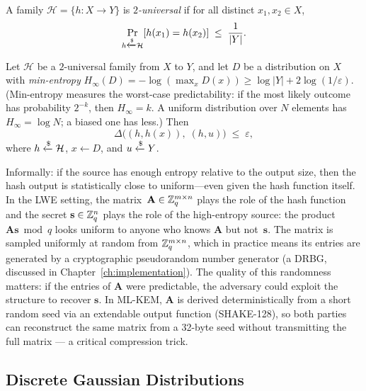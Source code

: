 \begin{definition}
\label{def:universal-hash}
A family $\mathcal{H} = \{h : X \to Y\}$ is \emph{$2$-universal} if for all distinct $x_1, x_2 \in X$,
\[
\Pr_{h \getsr \mathcal{H}}[h(x_1) = h(x_2)] \;\leq\; \frac{1}{|Y|}.
\]
\end{definition}

\begin{theorem}
\label{thm:lhl}
Let $\mathcal{H}$ be a $2$-universal family from $X$ to $Y$, and let $D$ be a distribution on $X$ with \emph{min-entropy} $H_\infty(D) = -\log(\max_x D(x)) \geq \log|Y| + 2\log(1/\varepsilon)$.  (Min-entropy measures the worst-case predictability: if the most likely outcome has probability $2^{-k}$, then $H_\infty = k$.  A uniform distribution over $N$ elements has $H_\infty = \log N$; a biased one has less.)  Then
\begin{equation}
\label{eq:lhl}
\Delta\bigl((h, h(x)), \; (h, u)\bigr) \;\leq\; \varepsilon,
\end{equation}
where $h \getsr \mathcal{H}$, $x \gets D$, and $u \getsr Y$.
\end{theorem}

Informally: if the source has enough entropy relative to the output size, then the hash output is statistically close to uniform---even given the hash function itself.  In the LWE setting, the matrix~$\mathbf{A} \in \mathbb{Z}_q^{m \times n}$ plays the role of the hash function and the secret $\mathbf{s} \in \mathbb{Z}_q^n$ plays the role of the high-entropy source: the product $\mathbf{A}\mathbf{s} \bmod q$ looks uniform to anyone who knows $\mathbf{A}$ but not~$\mathbf{s}$.  The matrix is sampled uniformly at random from $\mathbb{Z}_q^{m \times n}$, which in practice means its entries are generated by a cryptographic pseudorandom number generator (a DRBG, discussed in Chapter~\ref{ch:implementation}).  The quality of this randomness matters: if the entries of $\mathbf{A}$ were predictable, the adversary could exploit the structure to recover $\mathbf{s}$.  In ML-KEM, $\mathbf{A}$ is derived deterministically from a short random seed via an extendable output function (SHAKE-128), so both parties can reconstruct the same matrix from a 32-byte seed without transmitting the full matrix --- a critical compression trick.


\subsection{Discrete Gaussian Distributions}
\label{subsec:discrete-gaussian}

